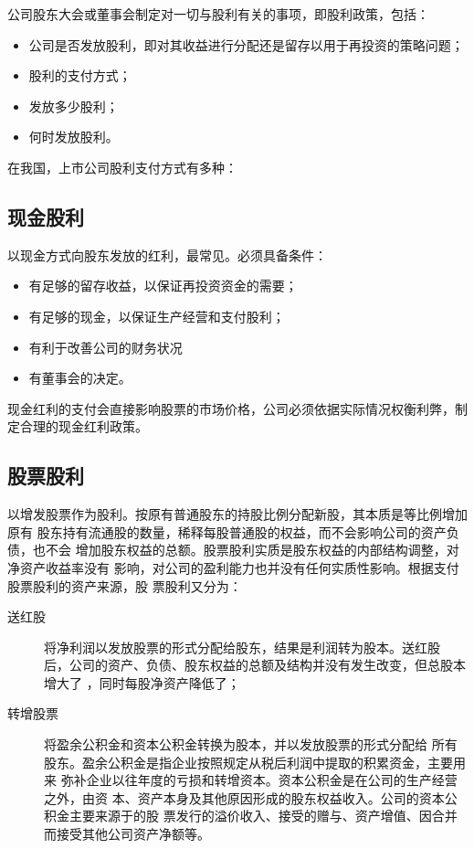\documentclass[../main]{subfiles}
\begin{document}
公司股东大会或董事会制定对一切与股利有关的事项，即股利政策，包括：

\begin{itemize}
  \item 公司是否发放股利，即对其收益进行分配还是留存以用于再投资的策略问题；
  \item 股利的支付方式；
  \item 发放多少股利；
  \item 何时发放股利。
\end{itemize}

在我国，上市公司股利支付方式有多种：

\subsection{现金股利}%
\label{sub:cash_dividend}

以现金方式向股东发放的红利，最常见。必须具备条件：

\begin{itemize}
  \item 有足够的留存收益，以保证再投资资金的需要；
  \item 有足够的现金，以保证生产经营和支付股利；
  \item 有利于改善公司的财务状况
  \item 有董事会的决定。
\end{itemize}

现金红利的支付会直接影响股票的市场价格，公司必须依据实际情况权衡利弊，制
定合理的现金红利政策。

\subsection{股票股利}%
\label{sub:stock_dividend}

以增发股票作为股利。按原有普通股东的持股比例分配新股，其本质是等比例增加原有
股东持有流通股的数量，稀释每股普通股的权益，而不会影响公司的资产负债，也不会
增加股东权益的总额。股票股利实质是股东权益的内部结构调整，对净资产收益率没有
影响，对公司的盈利能力也并没有任何实质性影响。根据支付股票股利的资产来源，股
票股利又分为：

\begin{description}
  \item[送红股]将净利润以发放股票的形式分配给股东，结果是利润转为股本。送红股
    后，公司的资产、负债、股东权益的总额及结构并没有发生改变，但总股本增大了
    ，同时每股净资产降低了；
  \item[转增股票]将盈余公积金和资本公积金转换为股本，并以发放股票的形式分配给
    所有股东。盈余公积金是指企业按照规定从税后利润中提取的积累资金，主要用来
    弥补企业以往年度的亏损和转增资本。资本公积金是在公司的生产经营之外，由资
    本、资产本身及其他原因形成的股东权益收入。公司的资本公积金主要来源于的股
    票发行的溢价收入、接受的赠与、资产增值、因合并而接受其他公司资产净额等。
\end{description}
\end{document}

